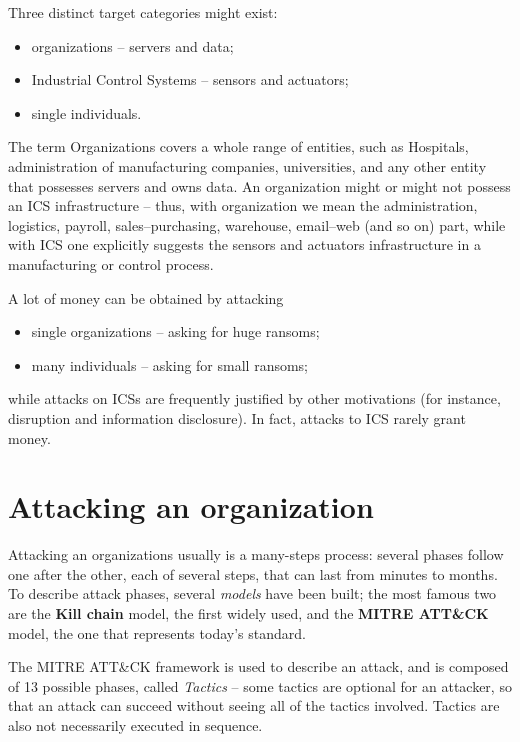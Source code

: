 \documentclass[10pt]{extbook}
\begin{document}
Three distinct target categories might exist:
\begin{itemize}
    \item organizations -- servers and data;
    \item Industrial Control Systems -- sensors and actuators;
    \item single individuals.
\end{itemize}

The term Organizations covers a whole range of entities, such as Hospitals,
administration of manufacturing companies, universities, and any other entity
that possesses servers and owns data. An organization might or might not
possess an ICS infrastructure -- thus, with organization we mean the
administration, logistics, payroll, sales\---purchasing, warehouse,
email\---web (and so on) part, while with ICS one explicitly suggests the
sensors and actuators infrastructure in a manufacturing or control process.

A lot of money can be obtained by attacking
\begin{itemize}
    \item single organizations -- asking for huge ransoms;
    \item many individuals -- asking for small ransoms;
\end{itemize}

while attacks on ICSs are frequently justified by other motivations (for
instance, disruption and information disclosure). In fact, attacks to ICS
rarely grant money.






\section{Attacking an organization}

Attacking an organizations usually is a many\--steps process: several phases
follow one after the other, each of several steps, that can last from minutes
to months. To describe attack phases, several \emph{models} have been built;
the most famous two are the \textbf{Kill chain} model, the first widely used,
and the \textbf{MITRE ATT\&CK} model, the one that represents today's standard.

The MITRE ATT\&CK framework is used to describe an attack, and is composed of
13 possible phases, called \emph{Tactics} -- some tactics are optional for an
attacker, so that an attack can succeed without seeing all of the tactics
involved. Tactics are also not necessarily executed in sequence.
\end{document}
